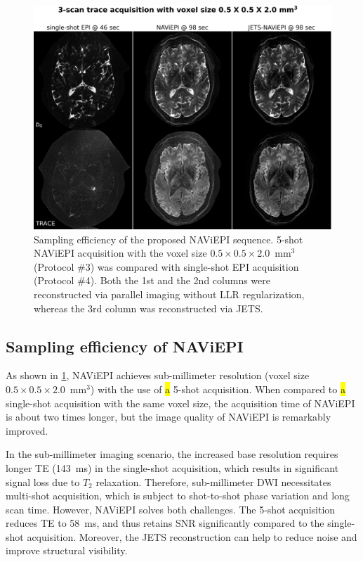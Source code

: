 \documentclass[preprint,12pt,authoryear,review]{elsarticle}
\begin{document}
    \begin{figure}
        \centering
        \includegraphics[width=\textwidth]{../figures/fig7.png}
        \caption{Sampling efficiency of the proposed NAViEPI sequence.
        5-shot NAViEPI acquisition with the voxel size
        $0.5\times0.5\times2.0$~mm$^3$ (Protocol \#3)
        was compared with single-shot EPI acquisition (Protocol \#4).
        Both the 1st and the 2nd columns were reconstructed
        via parallel imaging without LLR regularization,
        whereas the 3rd column was reconstructed via JETS.}
        \label{FIG:0.5mm_shots}
    \end{figure}

    \subsection{Sampling efficiency of NAViEPI}

    As shown in \cref{FIG:0.5mm_shots},
    NAViEPI achieves sub-millimeter resolution
    (voxel size $0.5\times0.5\times2.0$~mm$^3$)
    with the use of \hl{a} 5-shot acquisition.
    When compared to \hl{a} single-shot acquisition
    with the same voxel size,
    the acquisition time of NAViEPI is about two times longer,
    but the image quality of NAViEPI is remarkably improved.

    In the sub-millimeter imaging scenario,
    the increased base resolution requires longer TE (\SI{143}{\ms})
    in the single-shot acquisition,
    which results in significant signal loss due to $T_2$ relaxation.
    Therefore, sub-millimeter DWI necessitates multi-shot acquisition,
    which is subject to shot-to-shot phase variation and long scan time.
    However, NAViEPI solves both challenges.
    The 5-shot acquisition reduces TE to \SI{58}{\ms},
    and thus retains SNR significantly
    compared to the single-shot acquisition.
    Moreover, the JETS reconstruction can help to reduce noise
    and improve structural visibility.
\end{document}
